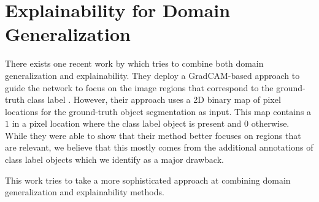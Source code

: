 \section{Explainability for Domain Generalization}

There exists one recent work by \citet{zunino2020explainable} which tries to combine both domain generalization and explainability. They deploy a GradCAM-based approach to guide the network to focus on the image regions that correspond to the ground-truth class label \citep{zunino2020explainable}. However, their approach uses a 2D binary map of pixel locations for the ground-truth object segmentation as input. This map contains a $1$ in a pixel location where the class label object is present and $0$ otherwise. While they were able to show that their method better focuses on regions that are relevant, we believe that this mostly comes from the additional annotations of class label objects which we identify as a major drawback. 

This work tries to take a more sophisticated approach at combining domain generalization and explainability methods.